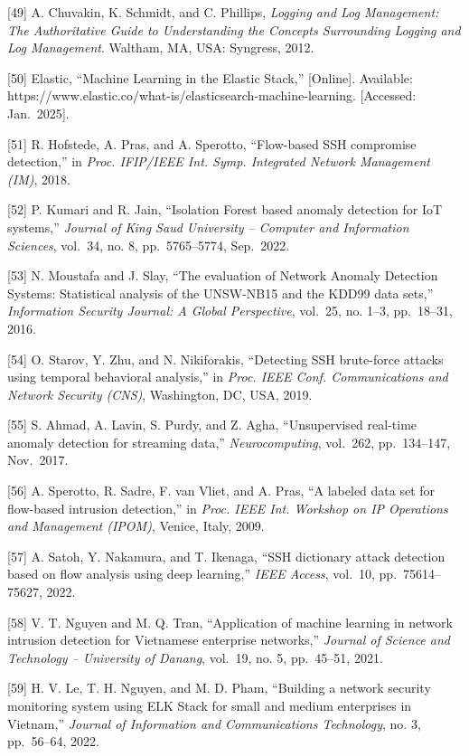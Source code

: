 \documentclass[
  a4paper]{report}
\begin{document}
{[}49{]} A. Chuvakin, K. Schmidt, and C. Phillips, \emph{Logging and Log
Management: The Authoritative Guide to Understanding the Concepts
Surrounding Logging and Log Management}. Waltham, MA, USA: Syngress,
2012.

{[}50{]} Elastic, ``Machine Learning in the Elastic Stack,''
{[}Online{]}. Available:
https://www.elastic.co/what-is/elasticsearch-machine-learning.
{[}Accessed: Jan.~2025{]}.

{[}51{]} R. Hofstede, A. Pras, and A. Sperotto, ``Flow-based SSH
compromise detection,'' in \emph{Proc. IFIP/IEEE Int. Symp. Integrated
Network Management (IM)}, 2018.

{[}52{]} P. Kumari and R. Jain, ``Isolation Forest based anomaly
detection for IoT systems,'' \emph{Journal of King Saud University --
Computer and Information Sciences}, vol.~34, no. 8, pp.~5765--5774,
Sep.~2022.

{[}53{]} N. Moustafa and J. Slay, ``The evaluation of Network Anomaly
Detection Systems: Statistical analysis of the UNSW-NB15 and the KDD99
data sets,'' \emph{Information Security Journal: A Global Perspective},
vol.~25, no. 1--3, pp.~18--31, 2016.

{[}54{]} O. Starov, Y. Zhu, and N. Nikiforakis, ``Detecting SSH
brute-force attacks using temporal behavioral analysis,'' in \emph{Proc.
IEEE Conf. Communications and Network Security (CNS)}, Washington, DC,
USA, 2019.

{[}55{]} S. Ahmad, A. Lavin, S. Purdy, and Z. Agha, ``Unsupervised
real-time anomaly detection for streaming data,'' \emph{Neurocomputing},
vol.~262, pp.~134--147, Nov.~2017.

{[}56{]} A. Sperotto, R. Sadre, F. van Vliet, and A. Pras, ``A labeled
data set for flow-based intrusion detection,'' in \emph{Proc. IEEE Int.
Workshop on IP Operations and Management (IPOM)}, Venice, Italy, 2009.

{[}57{]} A. Satoh, Y. Nakamura, and T. Ikenaga, ``SSH dictionary attack
detection based on flow analysis using deep learning,'' \emph{IEEE
Access}, vol.~10, pp.~75614--75627, 2022.

{[}58{]} V. T. Nguyen and M. Q. Tran, ``Application of machine learning
in network intrusion detection for Vietnamese enterprise networks,''
\emph{Journal of Science and Technology -- University of Danang},
vol.~19, no. 5, pp.~45--51, 2021.

{[}59{]} H. V. Le, T. H. Nguyen, and M. D. Pham, ``Building a network
security monitoring system using ELK Stack for small and medium
enterprises in Vietnam,'' \emph{Journal of Information and
Communications Technology}, no. 3, pp.~56--64, 2022.
\end{document}
